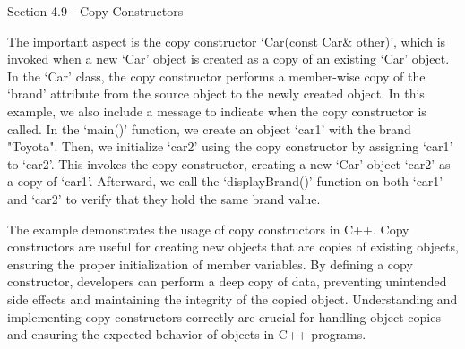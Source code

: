 \begin{notes}{Section 4.9 - Copy Constructors}
\begin{highlight}
        The important aspect is the copy constructor `Car(const Car\& other)', which is invoked when a new `Car' object is created as a copy of an existing `Car' object. In the `Car' class, the copy constructor performs a member-wise copy of the `brand' attribute 
        from the source object to the newly created object. In this example, we also include a message to indicate when the copy constructor is called. In the `main()' function, we create an object `car1' with the brand "Toyota". Then, we initialize `car2' using 
        the copy constructor by assigning `car1' to `car2'. This invokes the copy constructor, creating a new `Car' object `car2' as a copy of `car1'. Afterward, we call the `displayBrand()' function on both `car1' and `car2' to verify that they hold the same brand value.
        
        The example demonstrates the usage of copy constructors in C++. Copy constructors are useful for creating new objects that are copies of existing objects, ensuring the proper initialization of member variables. By defining a copy constructor, developers 
        can perform a deep copy of data, preventing unintended side effects and maintaining the integrity of the copied object. Understanding and implementing copy constructors correctly are crucial for handling object copies and ensuring the expected behavior of 
        objects in C++ programs.
    \end{highlight}
\end{notes}

